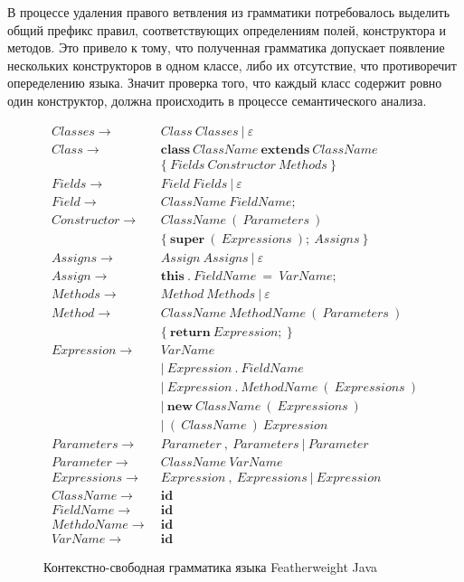 В процессе удаления правого ветвления из грамматики потребовалось выделить общий префикс правил,
соответствующих определениям полей, конструктора и методов.
Это привело к тому, что полученная грамматика допускает появление нескольких конструкторов в одном классе, либо их отсутствие,
что противоречит опеределению языка.
Значит проверка того, что каждый класс содержит ровно один конструктор, должна происходить в процессе семантического анализа.
\begin{figure}
    \begin{align*}
        Classes \rightarrow&\ Class\ Classes\ |\ \varepsilon\\
        Class \rightarrow&\ \pmb{class}\ ClassName\ \pmb{extends}\ ClassName\\
        &\ \{\ Fields\ Constructor\ Methods\ \}\\
        Fields \rightarrow&\ Field\ Fields\ |\ \varepsilon\\
        Field \rightarrow&\ ClassName\ FieldName;\\
        Constructor \rightarrow& \ ClassName\ (\ Parameters\ )\\
        &\ \{\ \pmb{super}\ (\ Expressions\ );\ Assigns\ \}\\
        Assigns \rightarrow&\ Assign\ Assigns\ |\ \varepsilon\\
        Assign \rightarrow&\ \pmb{this}\ .\ FieldName\ =\ VarName;\\
        Methods \rightarrow&\ Method\ Methods\ |\ \varepsilon\\
        Method \rightarrow&\ ClassName\ MethodName\ (\ Parameters\ )\\
        &\ \{\ \pmb{return}\ Expression;\ \}\\
        Expression \rightarrow&\ VarName\\
        &\ |\ Expression\ .\ FieldName\\
        &\ |\ Expression\ .\ MethodName\ (\ Expressions\ )\\
        &\ |\ \pmb{new}\ ClassName\ (\ Expressions\ )\\
        &\ |\ (\ ClassName\ )\ Expression\\
        Parameters \rightarrow&\ Parameter\ ,\ Parameters\ |\ Parameter\\
        Parameter \rightarrow&\ ClassName\ VarName\\
        Expressions \rightarrow&\ Expression\ ,\ Expressions\ |\ Expression\\
        ClassName \rightarrow&\ \pmb{id}\\
        FieldName \rightarrow&\ \pmb{id}\\
        MethdoName \rightarrow&\ \pmb{id}\\
        VarName \rightarrow&\ \pmb{id}
    \end{align*}
    \caption{Контекстно-свободная грамматика языка Featherweight Java}
    \label{cf-fj}
\end{figure}

